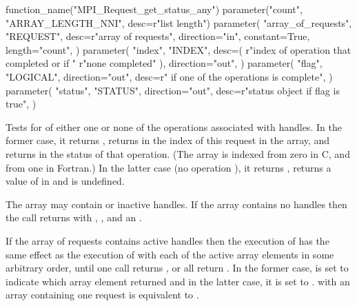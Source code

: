 \begin{mpi-binding}
    function_name("MPI_Request_get_status_any")
    parameter("count", "ARRAY_LENGTH_NNI", desc=r"list length")
    parameter(
        "array_of_requests",
        "REQUEST",
        desc=r"array of requests",
        direction="in", constant=True,
        length="count",
    )
    parameter(
        "index",
        "INDEX",
        desc=(
	    r"index of operation that completed or  if "
	    r"none completed"
        ),
        direction="out",
    )
    parameter(
        "flag",
        "LOGICAL",
        direction="out",
        desc=r" if one of the operations is complete",
    )
    parameter(
        "status",
        "STATUS",
        direction="out",
        desc=r"status object if flag is true",
    )
\end{mpi-binding}

Tests for  of
either one or none of the operations associated with  handles.
In the former case, it returns ,
returns in  the index of this request in the array,
and returns in  the status of that operation.
(The array is indexed from zero in C, and from one in Fortran.)
In the latter case (no operation ),
it returns , returns a value
of  in  and  is
undefined.

The array may contain  or inactive handles.
If the
array contains no  handles then the call returns
 with ,
\mpicode{ = }, and an  .

If the array of requests contains active handles then the execution of 
has the same effect as the execution of  with each of the active
array elements in some arbitrary order, until one call returns , or all return . In the
former case,  is set to indicate which array element returned  and in the latter
case, it is set to .  with an array containing
one request is equivalent to .

